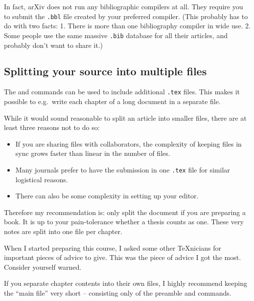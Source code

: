 In fact, arXiv does not run any bibliographic compilers at all.
They require you to submit the \verb|.bbl| file created by your preferred compiler.
(This probably has to do with two facts:
1. There is more than one bibliography compiler in wide use.
2. Some people use the same massive \verb|.bib| database for all their articles,
and probably don't want to share it.)



%
%
\subsection{Splitting your source into multiple files}

The  and  commands can be used to include additional \verb|.tex| files.
This makes it possible to e.g.\ write each chapter of a long document in a separate file.

\begin{practices}
While it would sound reasonable to split an article into smaller files,
there are at least three reasons not to do so:
\begin{itemize}
\item If you are sharing files with collaborators,
    the complexity of keeping files in sync grows faster than linear in the number of files.
\item Many journals prefer to have the submission in one \verb|.tex| file
    for similar logistical reasons.
\item There can also be some complexity in setting up your editor.
\end{itemize}

Therefore my recommendation is:
only split the document if you are preparing a book.
It is up to your pain-tolerance whether a thesis counts as one.
These very notes are split into one file per chapter.\footnotemark

When I started preparing this course,
I asked some other \TeX{}nicians for important pieces of advice to give.
This was the piece of advice I got the most.
Consider yourself warned.
\end{practices}

\begin{practices}
If you separate chapter contents into their own files,
I highly recommend keeping the ``main file'' very short
-- consisting only of the preamble and  commands.
\end{practices}

